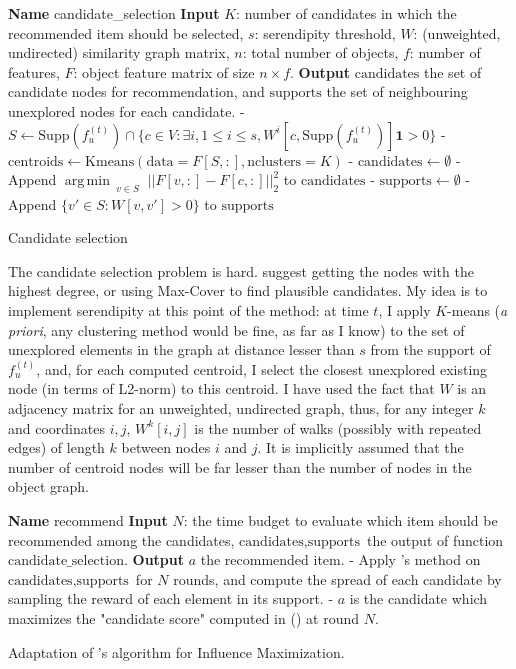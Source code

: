 \documentclass{article}
\DeclareMathOperator*{\argmin}{arg\,min\,}
\begin{document}
\begin{algorithm}
\begin{algorithmic}
\STATE \textbf{Name} candidate\_selection
\STATE \textbf{Input} $K$: number of candidates in which the recommended item should be selected, $s$: serendipity threshold, $W$: (unweighted, undirected) similarity graph matrix, $n$: total number of objects, $f$: number of features, $F$: object feature matrix of size $n \times f$.
\STATE \textbf{Output} $\text{candidates}$ the set of candidate nodes for recommendation, and $\text{supports}$ the set of neighbouring unexplored nodes for each candidate.
\STATE - $S \leftarrow \text{Supp}(f^{(t)}_{u}) \cap \{c \in V : \exists i, 1 \leq i \leq s, W^{i}[c, \text{Supp}(f^{(t)}_{u})]\textbf{1} > 0 \}$
\STATE - $\text{centroids} \leftarrow \text{Kmeans}(\text{data}=F[S,:],\text{nclusters}=K)$
\STATE - $\text{candidates} \leftarrow \emptyset$
\STATE - Append $\argmin_{\substack{v \in S}} ||F[v, :]-F[c, :]||^{2}_2$ to $\text{candidates}$
\ENDFOR
\STATE - $\text{supports} \leftarrow \emptyset$
\STATE - Append $\{v' \in S : W[v,v'] > 0\}$ to $\text{supports}$
\ENDFOR
\end{algorithmic}
\caption{Candidate selection}
\label{candidates}
\end{algorithm}

The candidate selection problem is hard. \citet{lagree2017effective} suggest getting the nodes with the highest degree, or using Max-Cover to find plausible candidates. My idea is to implement serendipity at this point of the method: at time $t$, I apply $K$-means (\emph{a priori}, any clustering method would be fine, as far as I know) to the set of unexplored elements in the graph at distance lesser than $s$ from the support of $f^{(t)}_{u}$, and, for each computed centroid, I select the closest unexplored existing node (in terms of L2-norm) to this centroid. I have used the fact that $W$ is an adjacency matrix for an unweighted, undirected graph, thus, for any integer $k$ and coordinates $i, j$, $W^{k}[i,j]$ is the number of walks (possibly with repeated edges) of length $k$ between nodes $i$ and $j$. It is implicitly assumed that the number of centroid nodes will be far lesser than the number of nodes in the object graph. 

\begin{algorithm}
\begin{algorithmic}
\STATE \textbf{Name} recommend
\STATE \textbf{Input} $N$: the time budget to evaluate which item should be recommended among the candidates, $\text{candidates}, \text{supports}$ the output of function $\text{candidate\_selection}$.
\STATE \textbf{Output} $a$ the recommended item.
\STATE - Apply \cite{lagree2017effective}'s method on $\text{candidates}, \text{supports}$ for $N$ rounds, and compute the spread of each candidate by sampling the reward of each element in its support.
\STATE - $a$ is the candidate which maximizes the "candidate score" computed in (\cite{lagree2017effective}) at round $N$.
\end{algorithmic}
\caption{Adaptation of \cite{lagree2017effective}'s algorithm for Influence Maximization.}
\label{lagree}
\end{algorithm}
\end{document}
